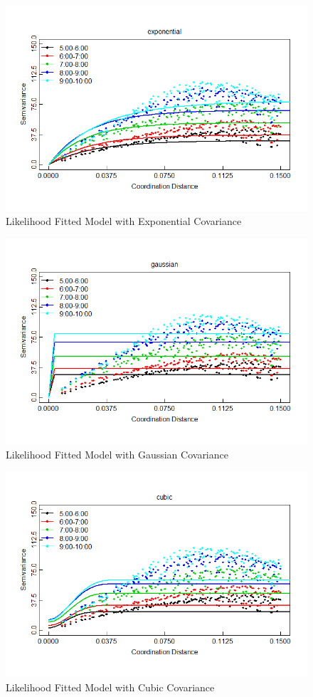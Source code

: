 \documentclass[hidelinks,12pt]{article}
\begin{document}
	\begin{figure}[!ht]
		\includegraphics[width=\textwidth]{lik_exponential.png}
		\caption{Likelihood Fitted Model with Exponential Covariance \label{fig:likexp}}
	\end{figure}
	\begin{figure}[!ht]
		\includegraphics[width=\textwidth]{lik_gaussian.png}
		\caption{Likelihood Fitted Model with Gaussian Covariance \label{fig:likgau}}
	\end{figure}
	\begin{figure}[!ht]
		\includegraphics[width=\textwidth]{lik_cubic.png}
		\caption{Likelihood Fitted Model with Cubic Covariance \label{fig:likcub}}
	\end{figure}
\end{document}
